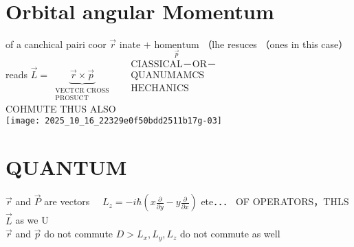 \section*{Orbital angular Momentum}
of a canchical pairi coor $\vec{r}$ inate $+\underset{\vec{p}}{\text { homentum }}$（lhe resuces （ones in this case）\\
reads $\vec{L}=\underbrace{\vec{r} \times \vec{p}}_{\substack{\text { VECTCR CROSS } \\ \text { PROSUCT }}} \quad \begin{gathered}\text { CIASSICAL－OR－} \\ \text { QUANUMAMCS } \\ \text { HECHANICS }\end{gathered}$\\
COHMUTE THUS ALSO\\
\texttt{[image: 2025\_10\_16\_22329e0f50bdd2511b17g-03]}

\section*{QUANTUM}
$\vec{r}$ and $\vec{P}$ are vectors $\quad L_{z}=-i \hbar\left(x \frac{\partial}{\partial y}-y \frac{\partial}{\partial x}\right)$ ete．．． OF OPERATORS，THLS\\
$\vec{L}$ as we U\\
$\vec{r}$ and $\vec{p}$ do not commute $D>L_{x}, L_{y}, L_{z}$ do not commute as well

